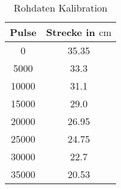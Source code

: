 \begin{table}[H]
    \centering
    \caption{Rohdaten Kalibration}

    \begin{tabular}{| c | c |}
      Pulse & Strecke in $\si{\centi \metre}$ \\
                              \hline
                              0 &	35.35 \\
                           5000 &	33.3 \\
                           10000 &	31.1 \\
                           15000 &	29.0 \\
                           20000 &	26.95 \\
                          25000 &	24.75 \\
                          30000 &	22.7 \\
                           35000 &	20.53 \\
                           \hline
    \end{tabular}
\end{table}
